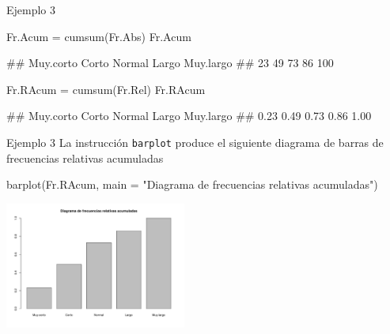 \documentclass[
  ignorenonframetext,
  aspectratio=169]{beamer}
\newenvironment{Shaded}{\begin{snugshade}}{\end{snugshade}}
\newcommand{\AttributeTok}[1]{\textcolor[rgb]{0.77,0.63,0.00}{#1}}
\newcommand{\FunctionTok}[1]{\textcolor[rgb]{0.00,0.00,0.00}{#1}}
\newcommand{\NormalTok}[1]{#1}
\newcommand{\OtherTok}[1]{\textcolor[rgb]{0.56,0.35,0.01}{#1}}
\newcommand{\StringTok}[1]{\textcolor[rgb]{0.31,0.60,0.02}{#1}}
\let\oldverbatim\verbatim
\let\endoldverbatim\endverbatim
\renewenvironment{verbatim}{\tiny\oldverbatim}{\endoldverbatim}
\begin{document}
\begin{frame}[fragile]{Ejemplo 3}
\protect\hypertarget{ejemplo-3-3}{}
\begin{Shaded}
\begin{Highlighting}[]
\NormalTok{Fr.Acum }\OtherTok{=} \FunctionTok{cumsum}\NormalTok{(Fr.Abs)}
\NormalTok{Fr.Acum}
\end{Highlighting}
\end{Shaded}

\begin{verbatim}
## Muy.corto     Corto    Normal     Largo Muy.largo 
##        23        49        73        86       100
\end{verbatim}

\begin{Shaded}
\begin{Highlighting}[]
\NormalTok{Fr.RAcum }\OtherTok{=} \FunctionTok{cumsum}\NormalTok{(Fr.Rel)}
\NormalTok{Fr.RAcum}
\end{Highlighting}
\end{Shaded}

\begin{verbatim}
## Muy.corto     Corto    Normal     Largo Muy.largo 
##      0.23      0.49      0.73      0.86      1.00
\end{verbatim}
\end{frame}

\begin{frame}[fragile]{Ejemplo 3}
\protect\hypertarget{ejemplo-3-4}{}
La instrucción \texttt{barplot} produce el siguiente diagrama de barras
de frecuencias relativas acumuladas

\begin{Shaded}
\begin{Highlighting}[]
\FunctionTok{barplot}\NormalTok{(Fr.RAcum, }\AttributeTok{main =} \StringTok{"Diagrama de frecuencias relativas acumuladas"}\NormalTok{)}
\end{Highlighting}
\end{Shaded}

\begin{center}\includegraphics[width=225px]{Hora4_files/figure-beamer/unnamed-chunk-13-1} \end{center}
\end{frame}
\end{document}
